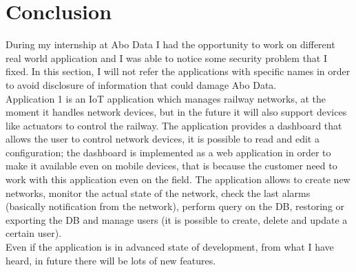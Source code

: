 

\chapter{Conclusion}\label{ch:end}

During my internship at Abo Data I had the opportunity to work on different real world application and I was able to notice some security problem that I fixed.\newline
In this section, I will not refer the applications with specific names in order to avoid disclosure of information that could damage Abo Data.\\

Application 1 is an IoT application which manages railway networks, at the moment it handles network devices, but in the future it will also support devices like actuators to control the railway.
The application provides a dashboard that allows the user to control network devices, it is possible to read and edit a configuration;
the dashboard is implemented as a web application in order to make it available even on mobile devices, that is because the customer need
to work with this application even on the field.\newline
The application allows to create new networks, monitor the actual state of the network, check the last alarms (basically notification from the network), perform query on the DB, restoring or exporting the DB and manage users (it is possible to create, delete and update a certain user).\\
Even if the application is in advanced state of development, from what I have heard, in future there will be lots of new features.\\

